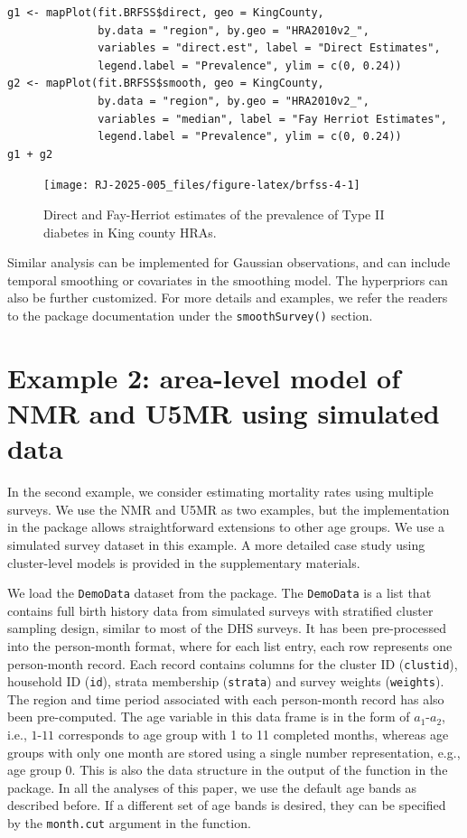\begin{verbatim}
g1 <- mapPlot(fit.BRFSS$direct, geo = KingCounty, 
              by.data = "region", by.geo = "HRA2010v2_", 
              variables = "direct.est", label = "Direct Estimates", 
              legend.label = "Prevalence", ylim = c(0, 0.24))
g2 <- mapPlot(fit.BRFSS$smooth, geo = KingCounty, 
              by.data = "region", by.geo = "HRA2010v2_", 
              variables = "median", label = "Fay Herriot Estimates", 
              legend.label = "Prevalence", ylim = c(0, 0.24))
g1 + g2
\end{verbatim}

\begin{figure}[!ht]
\texttt{[image: RJ-2025-005\_files/figure-latex/brfss-4-1]} \caption{Direct and Fay-Herriot estimates of the prevalence of Type II diabetes in King county HRAs.}\label{fig:brfss-4}
\end{figure}

Similar analysis can be implemented for Gaussian observations, and can include temporal smoothing or covariates in the smoothing model. The hyperpriors can also be further customized. For more details and examples, we refer the readers to the package documentation under the \texttt{smoothSurvey()} section.

\section{Example 2: area-level model of NMR and U5MR using simulated data}\label{example-2-area-level-model-of-nmr-and-u5mr-using-simulated-data}

In the second example, we consider estimating mortality rates using multiple surveys. We use the NMR and U5MR as two examples, but the implementation in the  package allows straightforward extensions to other age groups. We use a simulated survey dataset in this example. A more detailed case study using cluster-level models is provided in the supplementary materials.

We load the \texttt{DemoData} dataset from the  package. The \texttt{DemoData} is a list that contains full birth history data from simulated surveys with stratified cluster sampling design, similar to most of the DHS surveys. It has been pre-processed into the person-month format, where for each list entry, each row represents one person-month record. Each record contains columns for the cluster ID (\texttt{clustid}), household ID (\texttt{id}), strata membership (\texttt{strata}) and survey weights (\texttt{weights}). The region and time period associated with each person-month record has also been pre-computed. The age variable in this data frame is in the form of \(a_1\)-\(a_2\), i.e., \(1\)-\(11\) corresponds to age group with 1 to 11 completed months, whereas age groups with only one month are stored using a single number representation, e.g., age group \(0\). This is also the data structure in the output of the  function in the  package. In all the analyses of this paper, we use the default age bands as described before. If a different set of age bands is desired, they can be specified by the \texttt{month.cut} argument in the  function.

